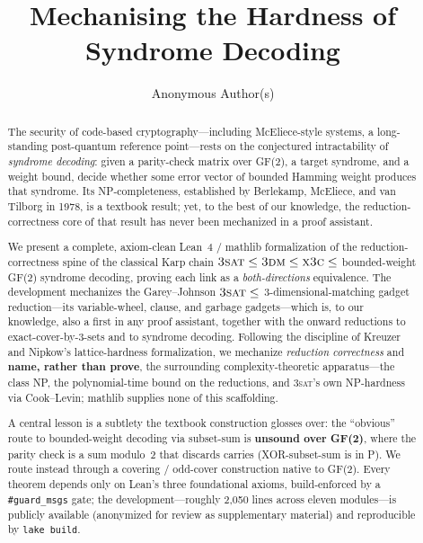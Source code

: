 \documentclass[sigplan,review,anonymous]{acmart}
\title{Mechanising the Hardness of Syndrome Decoding}
\author{Anonymous Author(s)}
\affiliation{\institution{Anonymous Institution}\country{}}
\begin{document}
\begin{abstract}
The security of code-based cryptography---including McEliece-style systems, a long-standing post-quantum
reference point---rests on the conjectured intractability of \emph{syndrome decoding}: given a parity-check
matrix over GF(2), a target syndrome, and a weight bound, decide whether some error vector of bounded Hamming
weight produces that syndrome. Its NP-completeness, established by Berlekamp, McEliece, and van Tilborg in 1978,
is a textbook result; yet, to the best of our knowledge, the reduction-correctness core of that result has never
been mechanized in a proof assistant.

We present a complete, axiom-clean Lean~4 / mathlib formalization of the reduction-correctness spine of the
classical Karp chain $\textsc{3sat} \le \textsc{3dm} \le \textsc{x3c} \le$ bounded-weight GF(2) syndrome
decoding, proving each link as a \emph{both-directions} equivalence. The development mechanizes the
Garey--Johnson $\textsc{3sat} \le$ 3-dimensional-matching gadget reduction---its variable-wheel, clause, and
garbage gadgets---which is, to our knowledge, also a first in any proof assistant, together with the onward
reductions to exact-cover-by-3-sets and to syndrome decoding. Following the discipline of Kreuzer and Nipkow's
lattice-hardness formalization, we mechanize \emph{reduction correctness} and \textbf{name, rather than prove},
the surrounding complexity-theoretic apparatus---the class NP, the polynomial-time bound on the reductions, and
\textsc{3sat}'s own NP-hardness via Cook--Levin; mathlib supplies none of this scaffolding.

A central lesson is a subtlety the textbook construction glosses over: the ``obvious'' route to bounded-weight
decoding via subset-sum is \textbf{unsound over GF(2)}, where the parity check is a sum modulo~2 that discards
carries (XOR-subset-sum is in P). We route instead through a covering / odd-cover construction native to GF(2).
Every theorem depends only on Lean's three foundational axioms, build-enforced by a \texttt{\#guard\_msgs}
gate; the development---roughly 2,050 lines across eleven modules---is publicly available (anonymized for
review as supplementary material) and reproducible by \texttt{lake build}.
\end{abstract}

\maketitle
\end{document}
